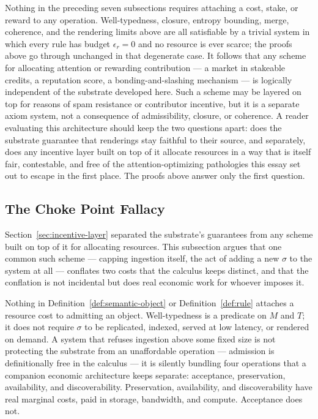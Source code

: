\documentclass[11pt]{article}
\theoremstyle{definition}
\begin{document}
Nothing in the preceding seven subsections requires attaching a cost, stake, or reward to any operation. Well-typedness, closure, entropy bounding, merge, coherence, and the rendering limits above are all satisfiable by a trivial system in which every rule has budget $\epsilon_r = 0$ and no resource is ever scarce; the proofs above go through unchanged in that degenerate case. It follows that any scheme for allocating attention or rewarding contribution --- a market in stakeable credits, a reputation score, a bonding-and-slashing mechanism --- is logically independent of the substrate developed here. Such a scheme may be layered on top for reasons of spam resistance or contributor incentive, but it is a separate axiom system, not a consequence of admissibility, closure, or coherence. A reader evaluating this architecture should keep the two questions apart: does the substrate guarantee that renderings stay faithful to their source, and separately, does any incentive layer built on top of it allocate resources in a way that is itself fair, contestable, and free of the attention-optimizing pathologies this essay set out to escape in the first place. The proofs above answer only the first question.

\subsection{The Choke Point Fallacy}
\label{sec:choke-point-fallacy}

Section~\ref{sec:incentive-layer} separated the substrate's guarantees from any scheme built on top of it for allocating resources. This subsection argues that one common such scheme --- capping ingestion itself, the act of adding a new $\sigma$ to the system at all --- conflates two costs that the calculus keeps distinct, and that the conflation is not incidental but does real economic work for whoever imposes it.

Nothing in Definition~\ref{def:semantic-object} or Definition~\ref{def:rule} attaches a resource cost to admitting an object. Well-typedness is a predicate on $M$ and $T$; it does not require $\sigma$ to be replicated, indexed, served at low latency, or rendered on demand. A system that refuses ingestion above some fixed size is not protecting the substrate from an unaffordable operation --- admission is definitionally free in the calculus --- it is silently bundling four operations that a companion economic architecture keeps separate: acceptance, preservation, availability, and discoverability. Preservation, availability, and discoverability have real marginal costs, paid in storage, bandwidth, and compute. Acceptance does not.
\end{document}
